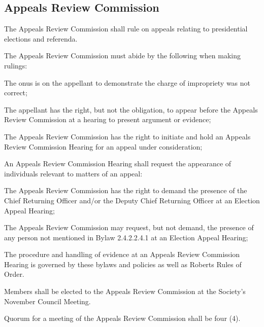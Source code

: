 \subsection{Appeals Review Commission}
\begin{longenum}[ label*=\thesubsection.\arabic*., align=left]
	\item The Appeals Review Commission shall rule on appeals relating to presidential elections and referenda.
    \item The Appeals Review Commission must abide by the following when making rulings: 
    \begin{longenum}[ label*=\arabic*., align=left]
		\item The onus is on the appellant to demonstrate the charge of impropriety was not correct;
        \item The appellant has the right, but not the obligation, to appear before the Appeals Review Commission at a hearing to present argument or evidence; 
        \item The Appeals Review Commission has the right to initiate and hold an Appeals Review Commission Hearing for an appeal under consideration; 
        \item An Appeals Review Commission Hearing shall request the appearance of individuals relevant to matters of an appeal:
        \begin{longenum}[ label*=\arabic*., align=left]
			\item The Appeals Review Commission has the right to demand the presence of the Chief Returning Officer and/or the Deputy Chief Returning Officer at an Election Appeal Hearing; 
            \item The Appeals Review Commission may request, but not demand, the presence of any person not mentioned in Bylaw 2.4.2.2.4.1 at an Election Appeal Hearing;
            \item The procedure and handling of evidence at an Appeals Review Commission Hearing is governed by these bylaws and policies as well as Roberts Rules of Order.
            
		\end{longenum}

	\end{longenum}
    
    \item Members shall be elected to the Appeals Review Commission at the Society's November Council Meeting.
    \item Quorum for a meeting of the Appeals Review Commission shall be four (4).
\end{longenum}

